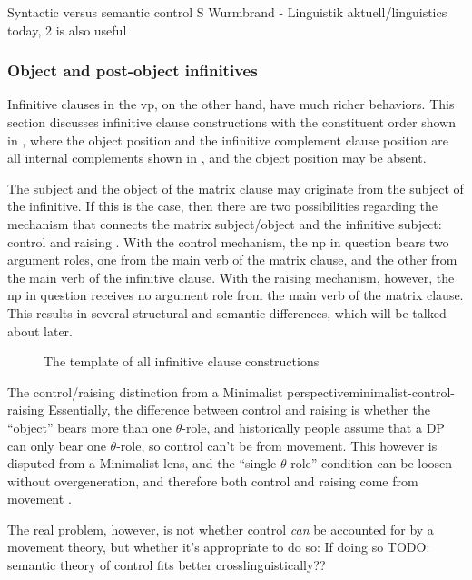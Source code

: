 \documentclass[UTF8, a4paper, oneside, scheme=plain, 12pt]{ctexbook}
\newcommand*{\citepages}[1]{pp.~{#1}}
\begin{document}
Syntactic versus semantic control
S Wurmbrand - Linguistik aktuell/linguistics today, 2 is also useful

\subsubsection{Object and post-object infinitives}

Infinitive clauses in the \acs{vp},
on the other hand, 
have much richer behaviors.
This section discusses infinitive clause constructions with the constituent order 
shown in ,
where the object position and the infinitive complement clause position 
are all internal complements shown in ,
and the object position may be absent.

The subject and the object of the matrix clause may originate from the subject of the infinitive.
If this is the case,
then there are two possibilities regarding the mechanism that connects the matrix subject/object 
and the infinitive subject:
control and raising \citet[\citepages{1194-1197}]{cgel}.
With the control mechanism,
the \acs{np} in question bears two argument roles,
one from the main verb of the matrix clause, and the other from the main verb of the infinitive clause.
With the raising mechanism, however,
the \acs{np} in question receives no argument role from the main verb of the matrix clause.
This results in several structural and semantic differences,
which will be talked about later.

\begin{figure}
    \centering
    {\small }
    \caption{The template of all infinitive clause constructions}
    \label{fig:complement.infinitive.template}
\end{figure}

\begin{theorybox}{The control/raising distinction from a Minimalist perspective}{minimalist-control-raising}
    Essentially, the difference between control and raising is 
    whether the ``object'' bears more than one $\theta$-role,
    and historically people assume that a DP can only bear one $\theta$-role,
    so control can't be from movement.
    This however is disputed from a Minimalist lens,
    and the ``single $\theta$-role'' condition 
    can be loosen without overgeneration,
    and therefore both control and raising come from movement
    \citet{hornstein1999movement}. 

    The real problem, however, is not whether control \emph{can} be accounted for 
    by a movement theory, 
    but whether it's appropriate to do so:
    If doing so TODO: semantic theory of control fits better crosslinguistically??
\end{theorybox}
\end{document}
